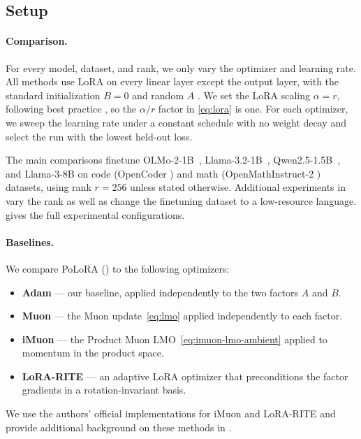 \documentclass[11pt]{article}
\newcommand{\methodname}{PoLoRA\xspace}
\theoremstyle{plain}
\theoremstyle{definition}
\theoremstyle{remark}
\theoremstyle{definition}
\begin{document}
\subsection{Setup}
\label{sec:exp-setup}

\paragraph{Comparison.}
For every model, dataset, and rank, we only vary the optimizer and learning rate. All methods use LoRA on every linear layer except the output layer, with the standard initialization $B=0$ and random $A$ \cite{lora}. We set the LoRA scaling $\alpha=r$, following best practice \cite{loralearnsless, raschka}, so the $\alpha/r$ factor in \eqref{eq:lora} is one. For each optimizer, we sweep the learning rate under a constant schedule with no weight decay and select the run with the lowest held-out loss.

The main comparisons finetune OLMo-2-1B~\cite{olmo2}, Llama-3.2-1B~\cite{llama3}, Qwen2.5-1.5B~\cite{qwen25}, and Llama-3-8B on code (OpenCoder \cite{opencoder}) and math (OpenMathInstruct-2 \cite{openmathinstruct2}) datasets, using rank $r=256$ unless stated otherwise. Additional experiments in  vary the rank as well as change the finetuning dataset to a low-resource language.  gives the full experimental configurations.

\paragraph{Baselines.} We compare \methodname{} () to the following optimizers:
\begin{itemize}[leftmargin=1.5em,itemsep=1pt,topsep=2pt]
  \item \textbf{Adam} \cite{adam} --- our baseline, applied independently to the two factors $A$ and $B$.
  \item \textbf{Muon} \cite{muon} --- the Muon update~\eqref{eq:lmo} applied independently to each factor.
  \item \textbf{iMuon} \cite{imuon} --- the Product Muon LMO~\eqref{eq:imuon-lmo-ambient} applied to momentum in the product space.
  \item \textbf{LoRA-RITE} \cite{lorarite} --- an adaptive LoRA optimizer that preconditions the factor gradients in a rotation-invariant basis.
\end{itemize}
We use the authors' official implementations for iMuon and LoRA-RITE and provide additional background on these methods in . 
\end{document}
